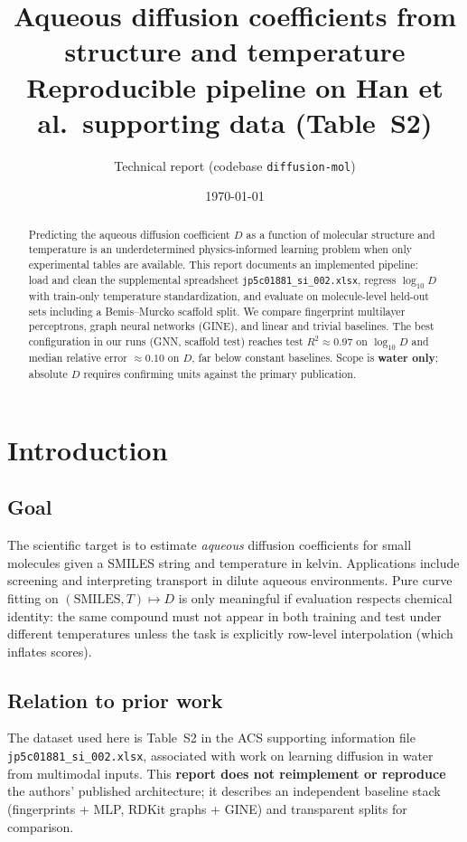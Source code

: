 \documentclass[11pt,a4paper]{article}
\title{\textbf{Aqueous diffusion coefficients from structure and temperature}\\[0.4em]
\large Reproducible pipeline on Han et al.\ supporting data (Table~S2)}
\author{Technical report (codebase \texttt{diffusion-mol})}
\date{\today}
\begin{document}
\maketitle

\begin{abstract}
Predicting the aqueous diffusion coefficient $D$ as a function of molecular structure and temperature is an underdetermined physics-informed learning problem when only experimental tables are available. This report documents an implemented pipeline: load and clean the supplemental spreadsheet \texttt{jp5c01881\_si\_002.xlsx}, regress $\log_{10} D$ with train-only temperature standardization, and evaluate on molecule-level held-out sets including a Bemis--Murcko scaffold split. We compare fingerprint multilayer perceptrons, graph neural networks (GINE), and linear and trivial baselines. The best configuration in our runs (GNN, scaffold test) reaches test $R^2 \approx 0.97$ on $\log_{10} D$ and median relative error $\approx 0.10$ on $D$, far below constant baselines. Scope is \textbf{water only}; absolute $D$ requires confirming units against the primary publication.
\end{abstract}

\tableofcontents
\newpage

\section{Introduction}
\subsection{Goal}
The scientific target is to estimate \emph{aqueous} diffusion coefficients for small molecules given a SMILES string and temperature in kelvin. Applications include screening and interpreting transport in dilute aqueous environments. Pure curve fitting on $(\text{SMILES}, T) \mapsto D$ is only meaningful if evaluation respects chemical identity: the same compound must not appear in both training and test under different temperatures unless the task is explicitly row-level interpolation (which inflates scores).

\subsection{Relation to prior work}
The dataset used here is Table~S2 in the ACS supporting information file \texttt{jp5c01881\_si\_002.xlsx}, associated with work on learning diffusion in water from multimodal inputs. This \textbf{report does not reimplement or reproduce} the authors' published architecture; it describes an independent baseline stack (fingerprints + MLP, RDKit graphs + GINE) and transparent splits for comparison.
\end{document}

